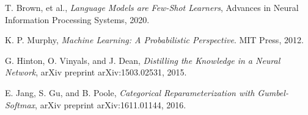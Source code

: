 \begin{thebibliography}{99}
    T. Brown, et al., \textit{Language Models are Few-Shot Learners}, Advances in Neural Information Processing Systems, 2020.
    
    K. P. Murphy, \textit{Machine Learning: A Probabilistic Perspective}. MIT Press, 2012.
    
    G. Hinton, O. Vinyals, and J. Dean, \textit{Distilling the Knowledge in a Neural Network}, arXiv preprint arXiv:1503.02531, 2015.
    
    E. Jang, S. Gu, and B. Poole, \textit{Categorical Reparameterization with Gumbel-Softmax}, arXiv preprint arXiv:1611.01144, 2016.
    
\end{thebibliography}
